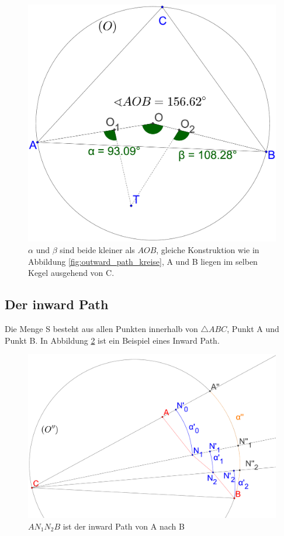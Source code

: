 \documentclass[a4paper,twoside]{IEEEtran}
\begin{document}
\begin{figure}[h!]
\centering
\includegraphics[width=0.8\linewidth]{outward_path_winkel.eps}
\caption{ $\alpha $ und $\beta $ sind beide kleiner als $ AOB $, gleiche Konstruktion wie in Abbildung \ref{fig:outward_path_kreise}, A und B liegen im selben Kegel ausgehend von C.}
\label{fig:outward_path_winkel}
\end{figure}







\subsection{Der inward Path}
Die Menge S besteht aus allen Punkten innerhalb von $\triangle {ABC} $, Punkt A und Punkt B.
In Abbildung \ref{fig:inward_path1} ist ein Beispiel eines Inward Path.


\begin{figure}[h!]
\centering
\includegraphics[width=1\linewidth]{inward_path1.eps}
\caption{$AN_1N_2B $ ist der inward Path von A nach B}
\label{fig:inward_path1}
\end{figure}






\end{document}
